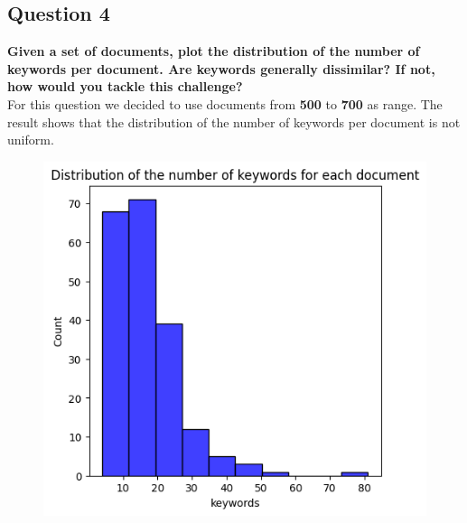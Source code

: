 \subsection{Question 4}
\textbf{Given a set of documents, plot the distribution of the number of keywords per document. Are keywords generally dissimilar? If not, how would you tackle this challenge?} \\
For this question we decided to use documents from \textbf{500} to \textbf{700} as range.
The result shows that the distribution of the number of keywords per
document is not uniform.

\begin{figure}[H]
  \begin{minipage}{.5\textwidth}
    \centering
    \includegraphics[width=1\linewidth]{images/keyword_distribution.png}
    \label{fig:question4_1} 
  \end{minipage}
  \begin{minipage}{.5\textwidth}
    \centering

\end{minipage}
\end{figure}
